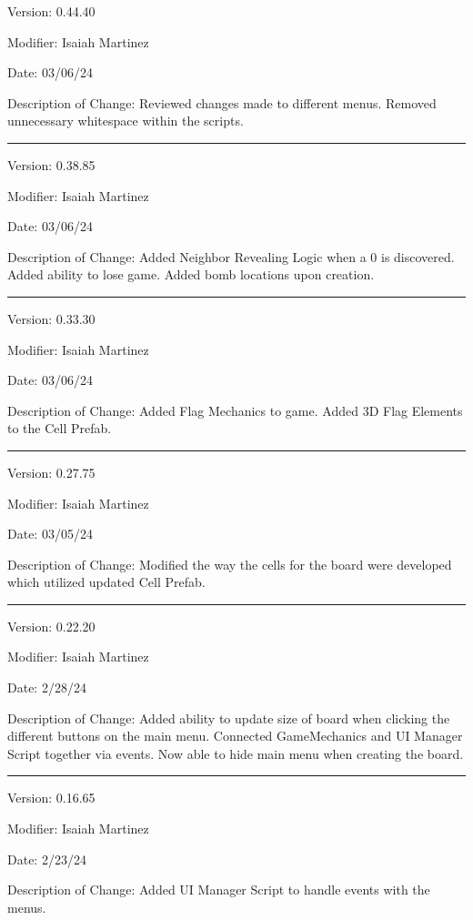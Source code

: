\documentclass[a4paper,10pt]{article}
\begin{document}
    Version: 0.44.40

    Modifier: Isaiah Martinez
    
    Date: 03/06/24
    
    Description of Change: Reviewed changes made to different menus.
    Removed unnecessary whitespace within the scripts.
 
    \noindent\rule{12cm}{0.4pt}

    Version: 0.38.85

    Modifier: Isaiah Martinez
    
    Date: 03/06/24
    
    Description of Change: Added Neighbor Revealing Logic when a 0 is discovered.
    Added ability to lose game.
    Added bomb locations upon creation.
 
    \noindent\rule{12cm}{0.4pt}

    Version: 0.33.30

    Modifier: Isaiah Martinez
    
    Date: 03/06/24
    
    Description of Change: Added Flag Mechanics to game.
    Added 3D Flag Elements to the Cell Prefab.
 
    \noindent\rule{12cm}{0.4pt}

    Version: 0.27.75

    Modifier: Isaiah Martinez
    
    Date: 03/05/24
    
    Description of Change: Modified the way the cells for the board were developed which utilized updated Cell Prefab.
 
    \noindent\rule{12cm}{0.4pt}
    
    Version: 0.22.20

    Modifier: Isaiah Martinez
    
    Date: 2/28/24
    
    Description of Change: Added ability to update size of board when clicking the different buttons on the main menu.
    Connected GameMechanics and UI Manager Script together via events.
    Now able to hide main menu when creating the board.
 
    \newpage

    \noindent\rule{12cm}{0.4pt}

    Version: 0.16.65

    Modifier: Isaiah Martinez
    
    Date: 2/23/24
    
    Description of Change: Added UI Manager Script to handle events with the menus.
 
\end{document}
